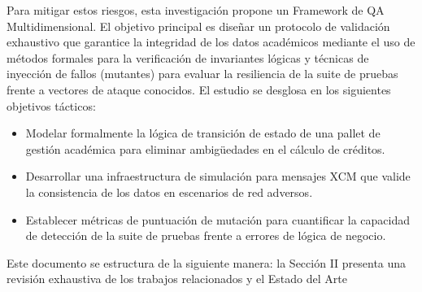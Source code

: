 Para mitigar estos riesgos, esta investigación propone un Framework de QA Multidimensional. El objetivo principal es diseñar un protocolo de validación exhaustivo que garantice la integridad de los datos académicos mediante el uso de métodos formales para la verificación de invariantes lógicas y técnicas de inyección de fallos (mutantes) para evaluar la resiliencia de la suite de pruebas frente a vectores de ataque conocidos. El estudio se desglosa en los siguientes objetivos tácticos:
\begin{itemize}
    \item Modelar formalmente la lógica de transición de estado de una pallet de gestión académica para eliminar ambigüedades en el cálculo de créditos.

    \item Desarrollar una infraestructura de simulación para mensajes XCM que valide la consistencia de los datos en escenarios de red adversos.

    \item Establecer métricas de puntuación de mutación para cuantificar la capacidad de detección de la suite de pruebas frente a errores de lógica de negocio.
\end{itemize}

Este documento se estructura de la siguiente manera: la Sección II presenta una revisión exhaustiva de los trabajos relacionados y el Estado del Arte